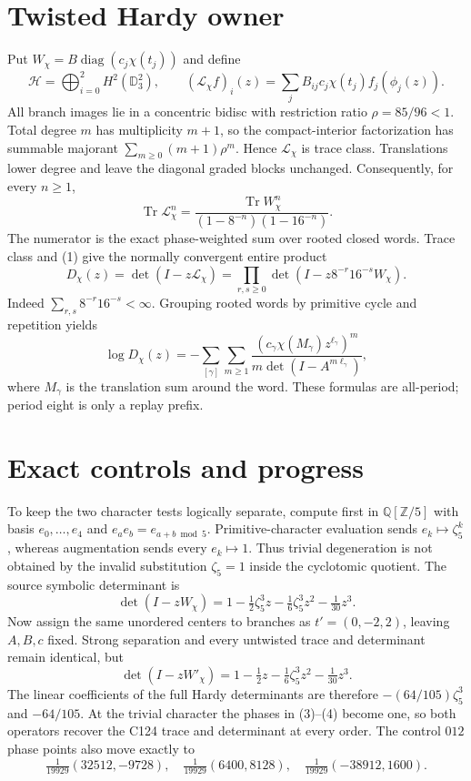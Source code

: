 \documentclass[10pt]{article}
\begin{document}
\section{Twisted Hardy owner}
Put $W_\chi=B\operatorname{diag}(c_j\chi(t_j))$ and define
\[
\mathcal H=\bigoplus_{i=0}^2H^2(\mathbb D_3^2),\qquad
(\mathcal L_\chi f)_i(z)=\sum_jB_{ij}c_j\chi(t_j)f_j(\phi_j(z)).
\]
All branch images lie in a concentric bidisc with restriction ratio
$\rho=85/96<1$.  Total degree $m$ has multiplicity $m+1$, so the
compact-interior factorization has summable majorant
$\sum_{m\ge0}(m+1)\rho^m$.  Hence $\mathcal L_\chi$ is trace class.
Translations lower degree and leave the diagonal graded blocks unchanged.
Consequently, for every $n\ge1$,
\begin{equation}
\operatorname{Tr}\mathcal L_\chi^n=
\frac{\operatorname{Tr}W_\chi^n}
{(1-8^{-n})(1-16^{-n})}. \tag{1}
\end{equation}
The numerator is the exact phase-weighted sum over rooted closed words.
Trace class and (1) give the normally convergent entire product
\begin{equation}
D_\chi(z)=\det(I-z\mathcal L_\chi)=
\prod_{r,s\ge0}\det(I-z8^{-r}16^{-s}W_\chi). \tag{2}
\end{equation}
Indeed $\sum_{r,s}8^{-r}16^{-s}<\infty$.  Grouping rooted words by primitive
cycle and repetition yields
\[
\log D_\chi(z)=-\sum_{[\gamma]}\sum_{m\ge1}
\frac{(c_\gamma\chi(M_\gamma)z^{\ell_\gamma})^m}
{m\det(I-A^{m\ell_\gamma})},
\]
where $M_\gamma$ is the translation sum around the word.  These formulas are
all-period; period eight is only a replay prefix.

\section{Exact controls and progress}
To keep the two character tests logically separate, compute first in
$\mathbb Q[\mathbb Z/5]$ with basis $e_0,\ldots,e_4$ and
$e_ae_b=e_{a+b\bmod5}$.  Primitive-character evaluation sends
$e_k\mapsto\zeta_5^k$, whereas augmentation sends every $e_k\mapsto1$.
Thus trivial degeneration is not obtained by the invalid substitution
$\zeta_5=1$ inside the cyclotomic quotient.
The source symbolic determinant is
\[
\det(I-zW_\chi)=1-\tfrac12\zeta_5^3z
-\tfrac16\zeta_5^3z^2-\tfrac1{30}z^3. \tag{3}
\]
Now assign the same unordered centers to branches as $t'=(0,-2,2)$, leaving
$A,B,c$ fixed.  Strong separation and every untwisted trace and determinant
remain identical, but
\[
\det(I-zW'_\chi)=1-\tfrac12z
-\tfrac16\zeta_5^3z^2-\tfrac1{30}z^3. \tag{4}
\]
The linear coefficients of the full Hardy determinants are therefore
$-(64/105)\zeta_5^3$ and $-64/105$.  At the trivial character the phases in
(3)--(4) become one, so both operators recover the C124 trace and determinant
at every order.  The control $012$ phase points also move exactly to
\[
\tfrac1{19929}(32512,-9728),\quad
\tfrac1{19929}(6400,8128),\quad
\tfrac1{19929}(-38912,1600).
\]
\end{document}

